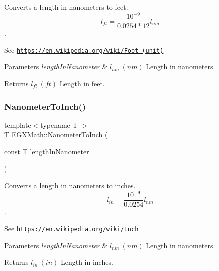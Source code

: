 Converts a length in nanometers to feet. \[ l_{ft}= \frac{10^{-9}}{0.0254 * 12} l_{nm} \]. 

See \href{https://en.wikipedia.org/wiki/Foot_(unit)}{\tt https\+://en.\+wikipedia.\+org/wiki/\+Foot\+\_\+(unit)} 
\begin{DoxyParams}{Parameters}
{\em length\+In\+Nanometer} & $ l_{nm}\ (nm)$ Length in nanometers. \\
\hline
\end{DoxyParams}
\begin{DoxyReturn}{Returns}
$ l_{ft}\ (ft)$ Length in feet. 
\end{DoxyReturn}
\mbox{\label{group___e_g_x_math-_conversions-_length_conversions-_nanometer-_imperial_ga8b72dde5616da5be31e8054f1facc501}} 
\subsubsection{\texorpdfstring{Nanometer\+To\+Inch()}{NanometerToInch()}}
{\footnotesize\ttfamily template$<$typename T $>$ \\
T E\+G\+X\+Math\+::\+Nanometer\+To\+Inch (\begin{DoxyParamCaption}\item[{const T}]{length\+In\+Nanometer }\end{DoxyParamCaption})}



Converts a length in nanometers to inches. \[ l_{in}= \frac{10^{-9}}{0.0254} l_{nm} \]. 

See \href{https://en.wikipedia.org/wiki/Inch}{\tt https\+://en.\+wikipedia.\+org/wiki/\+Inch} 
\begin{DoxyParams}{Parameters}
{\em length\+In\+Nanometer} & $ l_{nm}\ (nm)$ Length in nanometers. \\
\hline
\end{DoxyParams}
\begin{DoxyReturn}{Returns}
$ l_{in}\ (in)$ Length in inches. 
\end{DoxyReturn}
\mbox{\label{group___e_g_x_math-_conversions-_length_conversions-_nanometer-_imperial_gacfd62a86ae9a5085569840f3b7bbdb3e}} 

